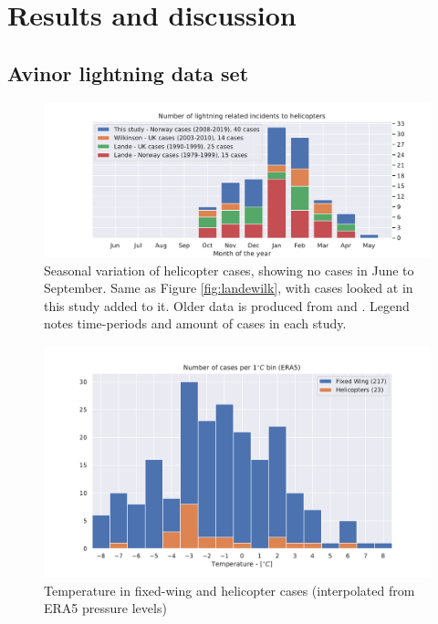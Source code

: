 \chapter{Results and discussion}

\section{Avinor lightning data set}\label{sec:avinor}

\begin{figure}
    \centering
    \includegraphics[width=\textwidth]{Figures/yearlydistribution.pdf}
    \caption{Seasonal variation of helicopter cases, showing no cases in June to September. Same as Figure \ref{fig:landewilk}, with cases looked at in this study added to it. Older data is produced from \cite{lande1999} and \cite{wilkinson2013}. Legend notes time-periods and amount of cases in each study. }
    \label{fig:yearlyvariation}
\end{figure}

\begin{figure}
    \centering
    \includegraphics[width=\textwidth]{Figures/temperature.pdf}
    \caption{Temperature in fixed-wing and helicopter cases (interpolated from ERA5 pressure levels)}
    \label{fig:temperatureera5}
\end{figure}


